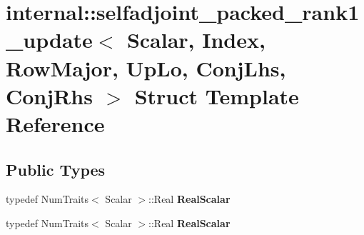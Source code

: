 \hypertarget{structinternal_1_1selfadjoint__packed__rank1__update_3_01_scalar_00_01_index_00_01_row_major_00_9e7850f711875a82e66e0710a9772df5}{}\section{internal\+:\+:selfadjoint\+\_\+packed\+\_\+rank1\+\_\+update$<$ Scalar, Index, Row\+Major, Up\+Lo, Conj\+Lhs, Conj\+Rhs $>$ Struct Template Reference}
\label{structinternal_1_1selfadjoint__packed__rank1__update_3_01_scalar_00_01_index_00_01_row_major_00_9e7850f711875a82e66e0710a9772df5}
\subsection*{Public Types}
\begin{DoxyCompactItemize}
\item 
\mbox{\label{structinternal_1_1selfadjoint__packed__rank1__update_3_01_scalar_00_01_index_00_01_row_major_00_9e7850f711875a82e66e0710a9772df5_a4cb2e0e77f9671b49679332acb32c4fd}} 
typedef Num\+Traits$<$ Scalar $>$\+::Real {\bfseries Real\+Scalar}
\item 
\mbox{\label{structinternal_1_1selfadjoint__packed__rank1__update_3_01_scalar_00_01_index_00_01_row_major_00_9e7850f711875a82e66e0710a9772df5_a4cb2e0e77f9671b49679332acb32c4fd}} 
typedef Num\+Traits$<$ Scalar $>$\+::Real {\bfseries Real\+Scalar}
\end{DoxyCompactItemize}
